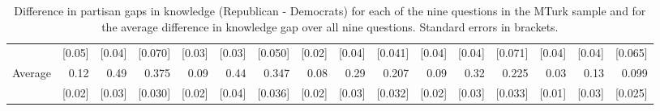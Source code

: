 \begin{table}[t]
\begin{adjustbox}{max width=\textwidth}
\begin{tabular}{l*{15}{D{.}{.}{-1}}}
			& {[}0.05{]} & {[}0.04{]} & {[}0.070{]} & {[}0.03{]} & {[}0.03{]} & {[}0.050{]} & {[}0.02{]} & {[}0.04{]} & {[}0.041{]} & {[}0.04{]} & {[}0.04{]} & {[}0.071{]} & {[}0.04{]} & {[}0.04{]} & {[}0.065{]} \\
			Average             & 0.12       & 0.49       & 0.375    & 0.09       & 0.44       & 0.347    & 0.08       & 0.29       & 0.207    & 0.09       & 0.32       & 0.225    & 0.03       & 0.13       & 0.099    \\
			& {[}0.02{]} & {[}0.03{]} & {[}0.030{]} & {[}0.02{]} & {[}0.04{]} & {[}0.036{]} & {[}0.02{]} & {[}0.03{]} & {[}0.032{]} & {[}0.02{]} & {[}0.03{]} & {[}0.033{]} & {[}0.01{]} & {[}0.03{]} & {[}0.025{]}\\
			\bottomrule                    
		\end{tabular}
	\end{adjustbox}
\caption*{\scriptsize Difference in partisan gaps in knowledge (Republican - Democrats) for each of the nine questions in the MTurk sample and for the average difference in knowledge gap over all nine questions. Standard errors in brackets.}
\end{table}
